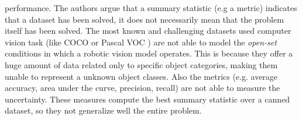 performance. The authors argue that a summary statistic (e.g a metric) indicates that a dataset has been solved, it does not necessarily mean that the problem itself has been solved. The most known and challenging datasets used computer vision task (like COCO \cite{coco} or Pascal VOC \cite{pascal}) are not able to model the \textit{open-set} conditions in which a robotic vision model operates. This is because they offer a huge amount of data related only to specific object categories, making them unable to represent a unknown object classes. Also the metrics (e.g. average accuracy, area under the curve, precision, recall) are not able to measure the uncertainty. These measures compute the best summary statistic over a canned dataset, so they not generalize well the entire problem. 
 

 
